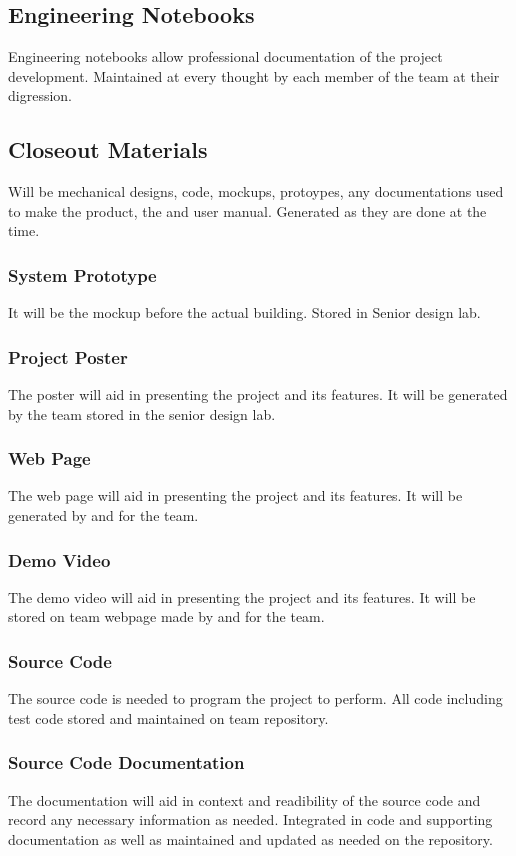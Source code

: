\subsection{Engineering Notebooks}
Engineering notebooks allow professional documentation of the project development. Maintained at every thought by each member of the team at their digression.

\subsection{Closeout Materials}
Will be mechanical designs, code, mockups, protoypes, any documentations used to make the product, the and user manual. Generated as they are done at the time. 

\subsubsection{System Prototype}
It will be the mockup before the actual building. Stored in Senior design lab.

\subsubsection{Project Poster}
The poster will aid in presenting the project and its features. It will be generated by the team stored in the senior design lab.

\subsubsection{Web Page}
The web page will aid in presenting the project and its features. It will be generated by and for the team.

\subsubsection{Demo Video}
The demo video will aid in presenting the project and its features. It will be stored on team webpage made by and for the team.

\subsubsection{Source Code}
The source code is needed to program the project to perform. All code including test code stored and maintained on team repository.

\subsubsection{Source Code Documentation}
The documentation will aid in context and readibility of the source code and record any necessary information as needed. Integrated in code and supporting documentation as well as maintained and updated as needed on the repository.


